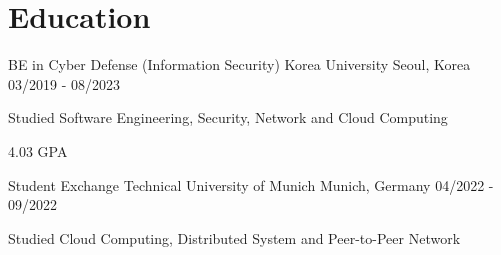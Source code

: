 \section{Education}
\cventry
{BE in Cyber Defense (Information Security)} %
{Korea University} %
{Seoul, Korea} %
{03/2019 - 08/2023} %
\begin{cvitems}
\item {Studied Software Engineering, Security, Network and Cloud Computing}
\item {4.03 GPA}
\end{cvitems}

\cventry
{Student Exchange} %
{Technical University of Munich} %
{Munich, Germany} %
{04/2022 - 09/2022} %
\begin{cvitems}
\item {Studied Cloud Computing, Distributed System and Peer-to-Peer Network}
\end{cvitems}
